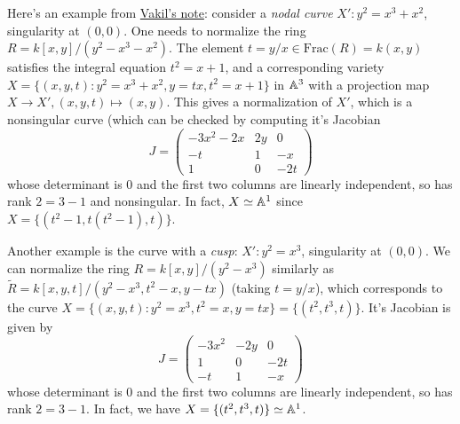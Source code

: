 \documentclass[letterpaper, 12pt]{article}
\begin{document}
Here's an example from \href{https://math.stanford.edu/~vakil/725/class20.pdf}{Vakil's note}: consider a \emph{nodal curve} $X': y^2 = x^3 + x^2$, singularity at $(0,0)$.
One needs to normalize the ring $R = k[x, y] / (y^2 - x^3 - x^2)$.
The element $t = y / x \in \mathrm{Frac}(R) = k(x, y)$ satisfies the integral equation $t^2 = x + 1$, and a corresponding variety $X = \{(x, y, t): y^2 = x^3 + x^2, y = tx, t^2 = x + 1\}$ in $\mathbb{A}^3$ with a projection map $X \to X', (x, y, t) \mapsto (x, y)$.
This gives a normalization of $X'$, which is a nonsingular curve (which can be checked by computing it's Jacobian
$$
J = \begin{pmatrix}
    -3x^2 - 2x & 2y & 0 \\
    -t & 1 & -x \\
    1 & 0 & -2t
\end{pmatrix}
$$
whose determinant is 0 and the first two columns are linearly independent, so has rank $2 = 3 - 1$ and nonsingular.
In fact, $X \simeq \mathbb{A}^1$ since $X = \{(t^2 - 1, t(t^2 - 1), t)\}$.

\begin{center}
\end{center}

Another example is the curve with a \emph{cusp}: $X': y^2 = x^3$, singularity at $(0, 0)$.
We can normalize the ring $R = k[x, y] / (y^2 - x^3)$ similarly as $\widetilde{R} = k[x, y, t] / (y^2 - x^3, t^2 -x, y - tx)$ (taking $t = y/x$), which corresponds to the curve $X = \{(x, y, t): y^2 = x^3, t^2 = x, y = tx\} = \{(t^2, t^3, t)\}$.
It's Jacobian is given by
$$
J = \begin{pmatrix}
    -3x^2 & -2y & 0 \\ 1 & 0 & -2t \\ -t & 1 & -x
\end{pmatrix}
$$
whose determinant is 0 and the first two columns are linearly independent, so has rank $2 = 3 - 1$.
In fact, we have $X = \{(t^2, t^3, t)\} \simeq \mathbb{A}^1$.

\begin{center}
\end{center}
\end{document}

